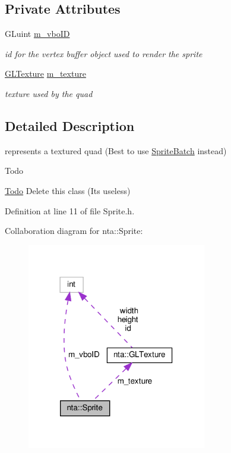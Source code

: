 \subsection*{Private Attributes}
\begin{DoxyCompactItemize}
\item 
\mbox{\label{classnta_1_1Sprite_a2d26de75fa95be871b3143847e22155c}} 
G\+Luint \hyperlink{classnta_1_1Sprite_a2d26de75fa95be871b3143847e22155c}{m\+\_\+vbo\+ID}
\begin{DoxyCompactList}\small\item\em id for the vertex buffer object used to render the sprite \end{DoxyCompactList}\item 
\mbox{\label{classnta_1_1Sprite_ac4fe2c6e0e34d133f5966a3ddc7a583e}} 
\hyperlink{structnta_1_1GLTexture}{G\+L\+Texture} \hyperlink{classnta_1_1Sprite_ac4fe2c6e0e34d133f5966a3ddc7a583e}{m\+\_\+texture}
\begin{DoxyCompactList}\small\item\em texture used by the quad \end{DoxyCompactList}\end{DoxyCompactItemize}


\subsection{Detailed Description}
represents a textured quad (Best to use \hyperlink{classnta_1_1SpriteBatch}{Sprite\+Batch} instead) \begin{DoxyRefDesc}{Todo}
\item[\hyperlink{todo__todo000006}{Todo}]Delete this class (It\textquotesingle{}s useless) \end{DoxyRefDesc}


Definition at line 11 of file Sprite.\+h.



Collaboration diagram for nta\+:\+:Sprite\+:\nopagebreak
\begin{figure}[H]
\begin{center}
\leavevmode
\includegraphics[width=222pt]{d8/da7/classnta_1_1Sprite__coll__graph}
\end{center}
\end{figure}



